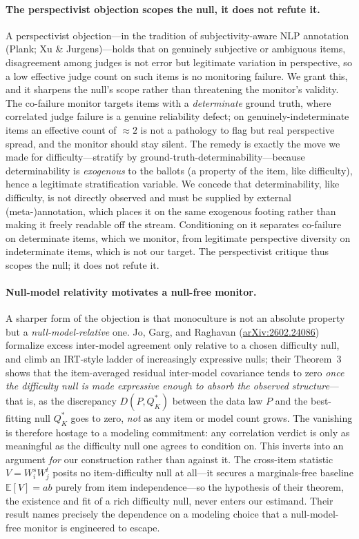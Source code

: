 \documentclass[11pt,a4paper]{article}
\begin{document}
\paragraph{The perspectivist objection scopes the null, it does not refute it.}
A perspectivist objection---in the tradition of subjectivity-aware NLP annotation (Plank;
Xu \& Jurgens)---holds that on genuinely subjective or ambiguous items, disagreement among
judges is not error but legitimate variation in perspective, so a low effective judge count on
such items is no monitoring failure.  We grant this, and it sharpens the null's scope rather than
threatening the monitor's validity.  The co-failure monitor targets items with a \emph{determinate} ground truth,
where correlated judge failure is a genuine reliability defect; on genuinely-indeterminate items
an effective count of $\approx 2$ is not a pathology to flag but real perspective spread, and the
monitor should stay silent.  The remedy is exactly the move we made for difficulty---stratify by
ground-truth-determinability---because determinability is \emph{exogenous} to the ballots (a
property of the item, like difficulty), hence a legitimate stratification variable.  We concede that
determinability, like difficulty, is not directly observed and must be supplied by external
(meta-)annotation, which places it on the same exogenous footing rather than making it freely
readable off the stream.  Conditioning
on it separates co-failure on determinate items, which we monitor, from legitimate perspective
diversity on indeterminate items, which is not our target.  The perspectivist critique thus scopes
the null; it does not refute it.

\paragraph{Null-model relativity motivates a null-free monitor.}
A sharper form of the objection is that monoculture is not an absolute property but a
\emph{null-model-relative} one.  Jo, Garg, and Raghavan
(\href{https://arxiv.org/abs/2602.24086}{arXiv:2602.24086}) formalize excess inter-model
agreement only relative to a chosen difficulty null, and climb an IRT-style ladder of
increasingly expressive nulls; their Theorem~3 shows that the item-averaged residual
inter-model covariance tends to zero \emph{once the difficulty null is made expressive enough
to absorb the observed structure}---that is, as the discrepancy $D(P, Q^*_K)$ between the data
law $P$ and the best-fitting null $Q^*_K$ goes to zero, \emph{not} as any item or model count
grows.  The vanishing is therefore hostage to a modeling commitment: any correlation verdict
is only as meaningful as the difficulty null one agrees to condition on.  This inverts into an
argument \emph{for} our construction rather than against it.  The cross-item statistic
$V = W_i^s W_j^t$ posits no item-difficulty null at all---it secures a marginals-free baseline
$\mathbb{E}[V] = ab$ purely from item independence---so the hypothesis of their theorem, the
existence and fit of a rich difficulty null, never enters our estimand.  Their result names
precisely the dependence on a modeling choice that a null-model-free monitor is engineered to
escape.
\end{document}
